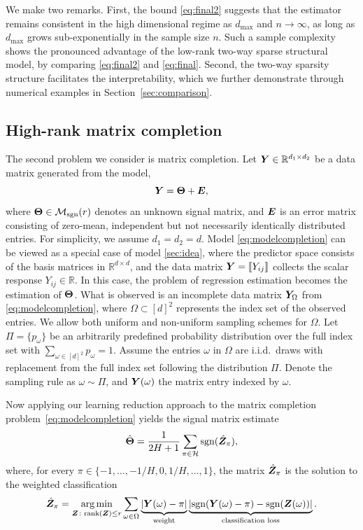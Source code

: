 \documentclass[aos]{imsart}
\theoremstyle{definition}
\newcommand*{\KeepStyleUnderBrace}[1]{%
\mathop{%
\mathchoice
{\underbrace{\displaystyle#1}}%
{\underbrace{\textstyle#1}}%
{\underbrace{\scriptstyle#1}}%
{\underbrace{\scriptscriptstyle#1}}%
}\limits
}
\def\sign{\textup{sgn}}
\def\rank{\textup{rank}}
\def\caliM{\tM_{\textup{sgn}}}
\begin{document}
\noindent
We make two remarks. First, the bound \eqref{eq:final2} suggests that the estimator remains consistent in the high dimensional regime as $d_{\max}$ and $n\to \infty$, as long as $d_{\max}$ grows sub-exponentially in the sample size $n$. Such a sample complexity shows the pronounced advantage of the low-rank two-way sparse structural model, by comparing \eqref{eq:final2} and \eqref{eq:final}. Second, the two-way sparsity structure facilitates the interpretability, which we further demonstrate through numerical examples in Section~\ref{sec:comparison}. 



\subsection{High-rank matrix completion}\label{sec:matrixcompletion}

The second problem we consider is matrix completion. Let $\bm Y\in\mathbb{R}^{d_1\times d_2}$ be a data matrix generated from the model,
\begin{equation}\label{eq:modelcompletion}
\mY=\mTheta+\mE,
\end{equation}
where $\mTheta\in\caliM(r)$ denotes an unknown signal matrix, and $\bm{E}$ is an error matrix consisting of zero-mean, independent but not necessarily identically distributed entries. For simplicity, we assume $d_1=d_2=d$. Model \eqref{eq:modelcompletion} can be viewed as a special case of model \eqref{sec:idea}, where the predictor space consists of the basis matrices in $\mathbb{R}^{d\times d}$, and the data matrix $\bm Y=\llbracket Y_{ij} \rrbracket$ collects the scalar response $Y_{ij} \in \mathbb{R}$. In this case, the problem of regression estimation becomes the estimation of $\bm{\Theta}$. What is observed is an incomplete data matrix $\bm Y_\Omega$ from \eqref{eq:modelcompletion}, where $\Omega \subset [d]^2$ represents the index set of the observed entries. We allow both uniform and non-uniform sampling schemes for $\Omega$. Let $\Pi=\{p_\omega\}$ be an arbitrarily predefined probability distribution over the full index set with $\sum_{\omega\in[d]^2}p_\omega=1$. Assume the entries $\omega$ in $\Omega$ are i.i.d.\ draws with replacement from the full index set following the distribution $\Pi$. Denote the sampling rule as $\omega \sim \Pi$, and $\bm Y(\omega)$ the matrix entry indexed by $\omega$.  

Now applying our learning reduction approach to the matrix completion problem~\eqref{eq:modelcompletion} yields the signal matrix estimate
\begin{equation}\label{eq:est}
\hat \mTheta = {1\over 2H+1}\sum_{\pi \in \tH}\sign(\hat \mZ_\pi),
\end{equation}
where, for every $\pi\in\{-1,\ldots,-1/H,0,1/H,\ldots,1\}$, the matrix $\hat {\bm Z}_\pi$ is the solution to the weighted classification
\begin{equation*}
\hat \mZ_\pi = \argmin_{\mZ\colon \rank(\mZ)\leq r}\sum_{\omega\in\Omega} \KeepStyleUnderBrace{|\mY(\omega)-\pi|}_{\text{weight}}\KeepStyleUnderBrace{|\sign(\mY(\omega)-\pi)-\sign(\mZ(\omega))|}_{\text{classification loss}}.
\end{equation*}
\end{document}
